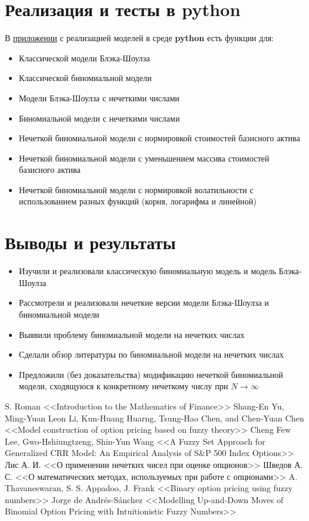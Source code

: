 \documentclass[a4paper,12pt]{extarticle} %
\begin{document}
	\section{Реализация и тесты в \textbf{python}}
	В \href{https://drive.google.com/file/d/1pRsXcyhmx7AT0D3hcHYBzhjENuwIqE97/view?usp=sharing}{приложении} с реализацией моделей в среде \textbf{python} есть функции для: 
	\begin{itemize}
	\item Классической модели Блэка-Шоулза
	\item Классической биномиальной модели
	\item Модели Блэка-Шоулза с нечеткими числами
	\item Биномиальной модели с нечеткими числами
	\item Нечеткой биномиальной модели с нормировкой стоимостей базисного актива
	\item Нечеткой биномиальной модели с уменьшением массива стоимостей базисного актива
	\item Нечеткой биномиальной модели с нормировкой волатильности с использованием разных функций (корня, логарифма и линейной)
	\end{itemize}
	
	\section{Выводы и результаты}
	\begin{itemize}
		\item Изучили и реализовали классическую биномиальную модель и модель Блэка-Шоулза
		\item Рассмотрели и реализовали нечеткие версии модели Блэка-Шоулза и биномиальной модели
		\item Выявили проблему биномиальной модели на нечетких числах
		\item Сделали обзор литературы по биномиальной модели на нечетких числах
		\item Предложили (без доказательства) модификацию нечеткой биномиальной модели, сходящуюся к конкретному нечеткому числу при $N \to \infty$
	\end{itemize}
	\newpage{}
	
	\begin{thebibliography}{99}
		 S. Roman <<Introduction to the Mathematics of Finance>>
		 Shang-En Yu, Ming-Yuan Leon Li, Kun-Huang Huarng, Tsung-Hao Chen, and Chen-Yuan Chen <<Model construction of option pricing based on fuzzy theory>>
		 Cheng Few Lee, Gwo-Hshiungtzeng, Shin-Yun Wang <<A Fuzzy Set Approach for Generalized CRR Model: An Empirical Analysis of S\&P 500 Index Options>>
		 Лис А. И. <<О применении нечетких чисел при оценке опционов>>
		 Шведов А. С. <<О математических методах, используемых при работе с опционами>>
		 A. Thavaneswaran, S. S. Appadoo, J. Frank <<Binary option pricing using fuzzy numbers>>
		 Jorge de Andrés-Sánchez <<Modelling Up-and-Down Moves of Binomial Option Pricing with Intuitionistic Fuzzy Numbers>>
	\end{thebibliography}
	\newpage{}
	
	\tableofcontents{}
	
\end{document}
